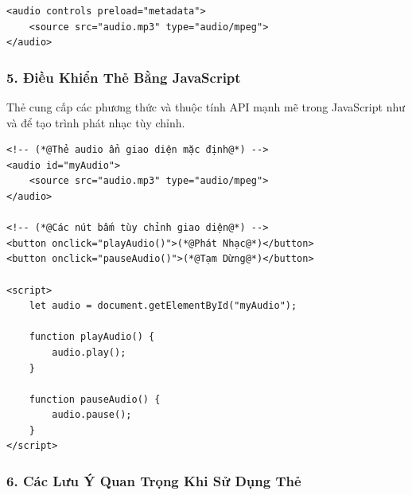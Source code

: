\begin{codeWindow}[Ví Dụ Tối Ưu Tải Âm Thanh Bằng preload="metadata"]
\begin{lstlisting}[language=HTML5]
<audio controls preload="metadata">
    <source src="audio.mp3" type="audio/mpeg">
</audio>
\end{lstlisting}
\end{codeWindow}

\subsubsection{5. Điều Khiển Thẻ  Bằng JavaScript}

Thẻ  cung cấp các phương thức và thuộc tính API mạnh mẽ trong JavaScript như  và  để tạo trình phát nhạc tùy chỉnh.

\begin{codeWindow}
\begin{lstlisting}[language=HTML5]
<!-- (*@Thẻ audio ẩn giao diện mặc định@*) -->
<audio id="myAudio">
    <source src="audio.mp3" type="audio/mpeg">
</audio>

<!-- (*@Các nút bấm tùy chỉnh giao diện@*) -->
<button onclick="playAudio()">(*@Phát Nhạc@*)</button>
<button onclick="pauseAudio()">(*@Tạm Dừng@*)</button>

<script>
    let audio = document.getElementById("myAudio");

    function playAudio() {
        audio.play();
    }

    function pauseAudio() {
        audio.pause();
    }
</script>
\end{lstlisting}
\end{codeWindow}

\subsubsection{6. Các Lưu Ý Quan Trọng Khi Sử Dụng Thẻ }


